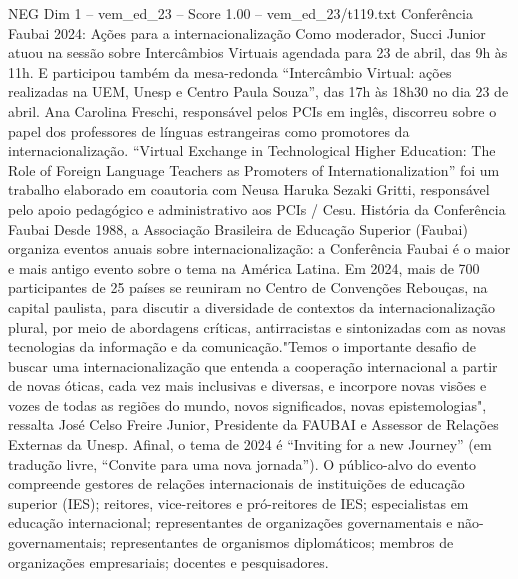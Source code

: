 \begin{textsample}{NEG Dim 1 – vem\_ed\_23 – Score 1.00 – vem\_ed\_23/t119.txt}  \label{ex:f1_neg_077}
Conferência Faubai 2024: Ações para a internacionalização Como moderador, Succi Junior atuou na sessão sobre Intercâmbios Virtuais agendada para 23 de abril, das 9h às 11h.
E participou também da mesa-redonda “Intercâmbio Virtual: ações realizadas na UEM, Unesp e Centro Paula Souza”, das 17h às 18h30 no dia 23 de abril.
Ana Carolina Freschi, responsável pelos PCIs em inglês, discorreu sobre o papel dos professores de línguas estrangeiras como promotores da internacionalização. “Virtual Exchange in Technological Higher Education: The Role of Foreign Language Teachers as Promoters of Internationalization” foi um trabalho elaborado em coautoria com Neusa Haruka Sezaki Gritti, responsável pelo apoio pedagógico e administrativo aos PCIs / Cesu.
História da Conferência Faubai Desde 1988, a Associação Brasileira de Educação Superior (Faubai) organiza eventos anuais sobre internacionalização: a Conferência Faubai é o maior e mais antigo evento sobre o tema na América Latina.
Em 2024, mais de 700 participantes de 25 países se reuniram no Centro de Convenções Rebouças, na capital paulista, para discutir a diversidade de contextos da internacionalização plural, por meio de abordagens críticas, antirracistas e sintonizadas com as novas tecnologias da informação e da comunicação."Temos o importante desafio de buscar uma internacionalização que entenda a cooperação internacional a partir de novas óticas, cada vez mais inclusivas e diversas, e incorpore novas visões e vozes de todas as regiões do mundo, novos significados, novas epistemologias", ressalta José Celso Freire Junior, Presidente da FAUBAI e Assessor de Relações Externas da Unesp.
Afinal, o tema de 2024 é “Inviting for a new Journey” (em tradução livre, “Convite para uma nova jornada”).
O público-alvo do evento compreende gestores de relações internacionais de instituições de educação superior (IES); reitores, vice-reitores e pró-reitores de IES; especialistas em educação internacional; representantes de organizações governamentais e não-governamentais; representantes de organismos diplomáticos; membros de organizações empresariais; docentes e pesquisadores.

\end{textsample}
